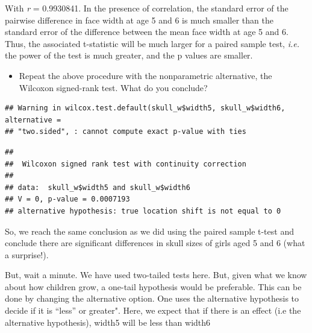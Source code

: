 \documentclass[
  12pt,
]{book}
\newenvironment{Shaded}{\begin{snugshade}}{\end{snugshade}}
\newcommand{\DataTypeTok}[1]{\textcolor[rgb]{0.13,0.29,0.53}{#1}}
\newcommand{\KeywordTok}[1]{\textcolor[rgb]{0.13,0.29,0.53}{\textbf{#1}}}
\newcommand{\NormalTok}[1]{#1}
\newcommand{\OperatorTok}[1]{\textcolor[rgb]{0.81,0.36,0.00}{\textbf{#1}}}
\newcommand{\OtherTok}[1]{\textcolor[rgb]{0.56,0.35,0.01}{#1}}
\newcommand{\StringTok}[1]{\textcolor[rgb]{0.31,0.60,0.02}{#1}}
\providecommand{\tightlist}{%
  \setlength{\itemsep}{0pt}\setlength{\parskip}{0pt}}
\begin{document}
With \emph{r} = 0.9930841. In the presence of correlation, the standard error of the pairwise difference in face width at age 5 and 6 is much smaller than the standard error of the difference between the mean face width at age 5 and 6. Thus, the associated t-statistic will be much larger for a paired sample test, \emph{i.e.} the power of the test is much greater, and the p values are smaller.

\begin{itemize}
\tightlist
\item
  Repeat the above procedure with the nonparametric alternative, the Wilcoxon signed-rank test. What do you conclude?
\end{itemize}

\begin{Shaded}
\end{Shaded}

\begin{verbatim}
## Warning in wilcox.test.default(skull_w$width5, skull_w$width6, alternative =
## "two.sided", : cannot compute exact p-value with ties
\end{verbatim}

\begin{verbatim}
## 
##  Wilcoxon signed rank test with continuity correction
## 
## data:  skull_w$width5 and skull_w$width6
## V = 0, p-value = 0.0007193
## alternative hypothesis: true location shift is not equal to 0
\end{verbatim}

So, we reach the same conclusion as we did using the paired sample t-test and conclude there are significant differences in skull sizes of girls aged 5 and 6 (what a surprise!).

But, wait a minute. We have used two-tailed tests here. But, given what we know about how children grow, a one-tail hypothesis would be preferable. This can be done by changing the alternative option. One uses the alternative hypothesis to decide if it is ``less'' or greater". Here, we expect that if there is an effect (i.e the alternative hypothesis), width5 will be less than width6

\begin{Shaded}
\end{Shaded}
\end{document}
